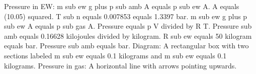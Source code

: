 Pressure in EW: m sub ew g plus p sub amb A equals p sub ew A.  
A equals (10.05) squared. T sub n equals 0.007853 equals 1.3397 bar.  
m sub ew g plus p sub ew A equals p sub gas A.  
Pressure equals p V divided by R T.  
Pressure sub amb equals 0.16628 kilojoules divided by kilogram.  
R sub ew equals 50 kilogram equals bar.  
Pressure sub amb equals bar.  
Diagram: A rectangular box with two sections labeled m sub ew equals 0.1 kilograms and m sub ew equals 0.1 kilograms.  
Pressure in gas: A horizontal line with arrows pointing upwards.